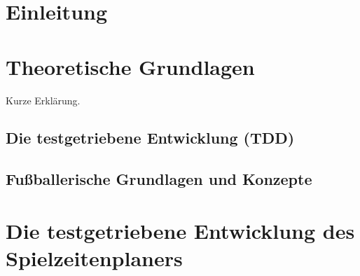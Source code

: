 %
%





\section{Einleitung}




\section{Theoretische Grundlagen}

Kurze Erklärung. 


\subsection{Die testgetriebene Entwicklung (TDD)}




\subsection{Fußballerische Grundlagen und Konzepte}




\section{Die testgetriebene Entwicklung des Spielzeitenplaners}

